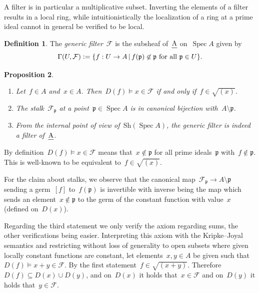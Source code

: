 \documentclass[10pt,reqno,a4paper]{amsbook}
\makeatletter
\theoremstyle{definition}
\newtheorem{defn}{Definition}[section]
\theoremstyle{plain}
\newtheorem{prop}[defn]{Proposition}
\theoremstyle{remark}
\newcommand{\F}{\mathcal{F}}
\newcommand{\ppp}{\mathfrak{p}}
\let\oldul\ul
\renewcommand{\ul}[1]{\text{\oldul{$#1$}}}
\newcommand{\Sh}{\mathrm{Sh}}
\DeclareMathOperator{\Spec}{Spec}
\newcommand{\?}{\,{:}\,}
\renewcommand{\_}{\mathpunct{.}\,}
\newcommand{\defeq}{\vcentcolon=}
\renewenvironment{proof}[1][\proofname]{\par
  \pushQED{\qed}%
  \normalfont \topsep6\p@\@plus6\p@\relax
  \trivlist
  \item[\hskip\labelsep
        \itshape
    #1\@addpunct{.}]\ignorespaces
}{%
  \popQED\endtrivlist\@endpefalse
}
\makeatother
\begin{document}
A filter is in particular a multiplicative subset. Inverting the
elements of a filter results in a local ring, while intuitionistically
the localization of a ring at a prime ideal cannot in general be verified to be local.

\begin{defn}The \emph{generic filter}~$\F$ is the subsheaf of~$\ul{A}$
on~$\Spec A$ given by
\[ \Gamma(U, \F) \defeq \{ f : U \to A \,|\,
  \text{$f(\ppp) \not\in \ppp$ for all $\ppp \in U$} \}. \]
\end{defn}

\begin{prop}\label{prop:basics-univ-filter}\ \begin{enumerate}
\item Let~$f \in A$ and~$x \in A$. Then~$D(f) \models x \in \F$ if and only
if~$f \in \sqrt{(x)}$.
\item The stalk~$\F_\ppp$ at a point~$\ppp \in \Spec A$
is in canonical bijection with~$A \setminus \ppp$.
\item From the internal point of view of~$\Sh(\Spec A)$, the generic
filter is indeed a filter of~$\ul{A}$.
\end{enumerate}
\end{prop}
\begin{proof}By definition~$D(f) \models x \in \F$ means that~$x \not\in \ppp$
for all prime ideals~$\ppp$ with~$f \not\in \ppp$. This is well-known to be
equivalent to~$f \in \sqrt{(x)}$.

For the claim about stalks, we observe that the canonical map~$\F_\ppp \to A
\setminus \ppp$ sending a germ~$[f]$ to~$f(\ppp)$ is invertible with inverse
being the map which sends an element~$x \not\in \ppp$ to the germ of the
constant function with value~$x$ (defined on~$D(x)$).

Regarding the third statement we only verify the axiom regarding sums, the
other verifications being easier. Interpreting this axiom with the Kripke--Joyal
semantics and restricting without loss of generality to open subsets where
given locally constant functions are constant, let elements~$x,y \in A$ be
given such that~$D(f) \models x+y \in \F$. By the first statement~$f \in
\sqrt{(x+y)}$. Therefore~$D(f) \subseteq D(x) \cup D(y)$, and on~$D(x)$ it
holds that~$x \in \F$ and on~$D(y)$ it holds that~$y \in \F$.
\end{proof}
\end{document}

